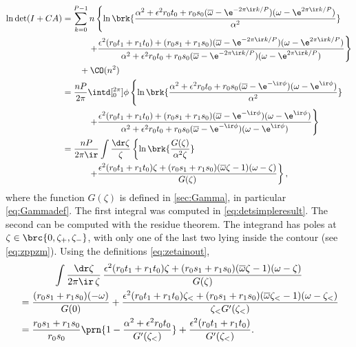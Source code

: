 \documentclass[12pt]{article}
\newcommand{\omb}{\overline{\omega}}
\begin{document}
\begin{equation}\label{eq:detrepints}
\begin{aligned}
  \ln\det(I+CA) &=  \sum_{k=0}^{P-1}
    n \left\{
      \ln\brk{ \frac{\alpha^2+\epsilon^2r_0t_0 + r_0s_0 (\omb-\e^{-2\pi\ir k/P}) (\omega-\e^{2\pi\ir k/P})} {\alpha^2}}
    \right.\\
    &\qquad\quad \left.+
      \frac{ \epsilon^2 (r_0t_1+r_1t_0) + (r_0s_1+r_1s_0) (\omb-\e^{-2\pi\ir k/P}) (\omega-\e^{2\pi\ir k/P})} { \alpha^2+\epsilon^2r_0t_0 + r_0s_0 (\omb-\e^{-2\pi\ir k/P}) (\omega-\e^{2\pi\ir k/P})}
    \right\}\\
   &\qquad +\CO(n^2)\\
    &= \frac{nP}{2\pi} \intd[_0^{2\pi}]{\phi} \left\{
     \ln\brk{ \frac{\alpha^2+\epsilon^2r_0t_0 + r_0s_0 (\omb-\e^{-\ir\phi}) (\omega-\e^{\ir\phi})} {\alpha^2}}
    \right.\\
    &\qquad\quad \left.+
      \frac{ \epsilon^2 (r_0t_1+r_1t_0) + (r_0s_1+r_1s_0) (\omb-\e^{-\ir\phi}) (\omega-\e^{\ir\phi})} { \alpha^2+\epsilon^2r_0t_0 + r_0s_0 (\omb-\e^{-\ir\phi}) (\omega-\e^{\ir\phi})}
    \right\}\\
    &= \frac{nP}{2\pi\ir} \int \frac{\dr\zeta}{\zeta} \left\{ \ln \brk{\frac{G(\zeta)}{\alpha^2\zeta}}
    \right.\\
    &\qquad\quad \left.+
      \frac{ \epsilon^2 (r_0t_1+r_1t_0)\zeta + (r_0s_1+r_1s_0) (\omb\zeta-1) (\omega-\zeta)} {G(\zeta)}
    \right\},
\end{aligned}
\end{equation}
%
where the function $G(\zeta)$ is defined in \autoref{sec:Gamma}, in particular \eqref{eq:Gammadef}.
The first integral was computed in \eqref{eq:detsimpleresult}.
The second can be computed with the residue theorem.
The integrand has poles at $\zeta\in\brc{0,\zeta_+,\zeta_-}$, with only one of the last two lying inside the contour (see \eqref{eq:zppzm}).
Using the definitions \eqref{eq:zetainout},
%
\begin{multline}\label{eq:repcontoutint}
  \int \frac{\dr\zeta}{2\pi\ir\,\zeta}\,
    \frac{ \epsilon^2 (r_0t_1+r_1t_0)\zeta + (r_0s_1+r_1s_0) (\omb\zeta-1) (\omega-\zeta)} {G(\zeta)} \\
    \begin{aligned}
      &= \frac{(r_0s_1+r_1s_0)(-\omega)}{G(0)}
      + \frac{ \epsilon^2 (r_0t_1+r_1t_0)\zeta_< + (r_0s_1+r_1s_0) (\omb\zeta_<-1) (\omega-\zeta_<)} {\zeta_< G'(\zeta_<)} \\
      &= \frac{r_0s_1+r_1s_0}{r_0s_0}\prn{1-\frac{\alpha^2+\epsilon^2r_0t_0} {G'(\zeta_<)}}
      + \frac{ \epsilon^2 (r_0t_1+r_1t_0)} {G'(\zeta_<)} .
    \end{aligned}
\end{multline}
%
\end{document}
